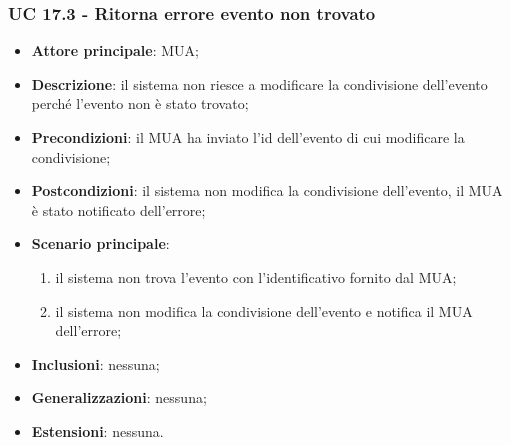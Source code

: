 \subsubsection{UC 17.3 - Ritorna errore evento non trovato} \label{sec:UC17.3}
    \begin{itemize}
        \item \textbf{Attore principale}: MUA;
        \item \textbf{Descrizione}: il sistema non riesce a modificare la condivisione dell'evento perché l'evento non è stato trovato;
        \item \textbf{Precondizioni}: il MUA ha inviato l'id dell'evento di cui modificare la condivisione;
        \item \textbf{Postcondizioni}: il sistema non modifica la condivisione dell'evento, il MUA è stato notificato dell'errore;
        \item \textbf{Scenario principale}:
            \begin{enumerate}
                \item il sistema non trova l'evento con l'identificativo fornito dal MUA;
                \item il sistema non modifica la condivisione dell'evento e notifica il MUA dell'errore;
            \end{enumerate}
        \item \textbf{Inclusioni}: nessuna;
        \item \textbf{Generalizzazioni}: nessuna;
        \item \textbf{Estensioni}: nessuna.
    \end{itemize}

